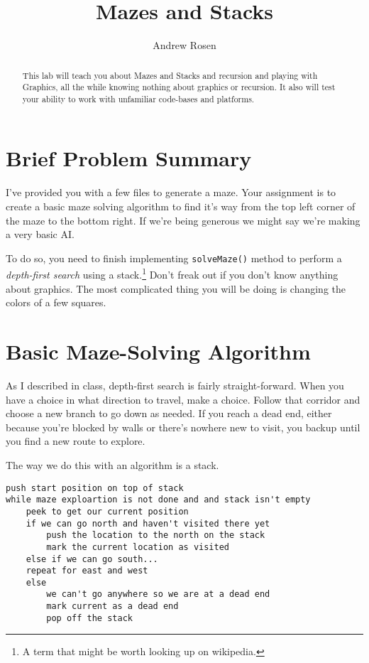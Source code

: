 \documentclass[10pt,letterpaper]{article}
\author{Andrew Rosen}
\title{Mazes and Stacks}
\date{}
\begin{document}
	
	
	\maketitle
	\begin{abstract}
		This lab will teach you about Mazes and Stacks and recursion and playing with Graphics, all the while knowing nothing about graphics or recursion.
		It also will test your ability to work with unfamiliar code-bases and platforms.
	\end{abstract}
	
	
	
	\section{Brief Problem Summary}
	
	I've provided you with a few files to generate a maze.
	Your assignment is to create a basic maze solving algorithm to find it's way from the top left corner of the maze to the bottom right.
	If we're being generous we might say we're making a very basic AI.
	
	To do so, you need to finish implementing \texttt{solveMaze()} method to perform a \textit{depth-first search} using a stack.\footnote{A term that might be worth looking up on wikipedia.}
	Don't freak out if you don't know anything about graphics.
	The most complicated thing you will be doing is changing the colors of a few squares.
	
	
	\section{Basic Maze-Solving Algorithm}
	As I described in class,  depth-first search is fairly straight-forward. 
	When you have a choice in what direction to travel, make a choice.
	Follow that corridor and choose a new branch to go down as needed.
	If you reach a dead end, either because you're blocked by walls or there's nowhere new to visit, you backup until you find a new route to explore.
	
	The way we do this with an algorithm is a stack.
\begin{verbatim}
push start position on top of stack
while maze exploartion is not done and and stack isn't empty
    peek to get our current position
    if we can go north and haven't visited there yet
        push the location to the north on the stack
        mark the current location as visited
    else if we can go south...
    repeat for east and west
    else
        we can't go anywhere so we are at a dead end
        mark current as a dead end
        pop off the stack
\end{verbatim}
	
\end{document}
